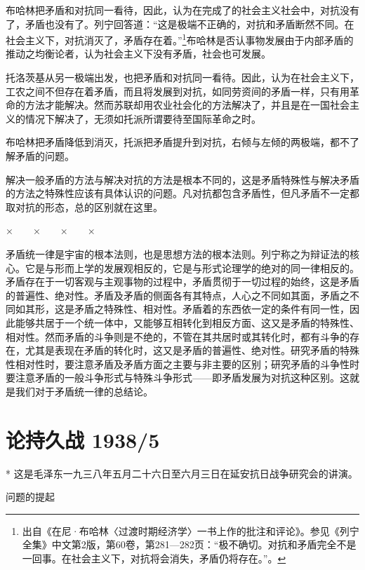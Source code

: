 \documentclass[UTF8, 12pt, a4paper]{ctexrep}
\begin{document}
布哈林把矛盾和对抗同一看待，因此，认为在完成了的社会主义社会中，对抗没有了，矛盾也没有了。列宁回答道：“这是极端不正确的，对抗和矛盾断然不同。在社会主义下，对抗消灭了，矛盾存在着。”\footnote{出自《在尼·布哈林〈过渡时期经济学〉一书上作的批注和评论》。参见《列宁全集》中文第2版，第60卷，第281—282页：“极不确切。对抗和矛盾完全不是一回事。在社会主义下，对抗将会消失，矛盾仍将存在。”。}布哈林是否认事物发展由于内部矛盾的推动之均衡论者，认为社会主义下没有矛盾，社会也可发展。

托洛茨基从另一极端出发，也把矛盾和对抗同一看待。因此，认为在社会主义下，工农之间不但存在着矛盾，而且将发展到对抗，如同劳资间的矛盾一样，只有用革命的方法才能解决。然而苏联却用农业社会化的方法解决了，并且是在一国社会主义的情况下解决了，无须如托派所谓要待至国际革命之时。

布哈林把矛盾降低到消灭，托派把矛盾提升到对抗，右倾与左倾的两极端，都不了解矛盾的问题。

解决一般矛盾的方法与解决对抗的方法是根本不同的，这是矛盾特殊性与解决矛盾的方法之特殊性应该有具体认识的问题。凡对抗都包含矛盾性，但凡矛盾不一定都取对抗的形态，总的区别就在这里。

×　　×　　×　　×

矛盾统一律是宇宙的根本法则，也是思想方法的根本法则。列宁称之为辩证法的核心。它是与形而上学的发展观相反的，它是与形式论理学的绝对的同一律相反的。矛盾存在于一切客观与主观事物的过程中，矛盾贯彻于一切过程的始终，这是矛盾的普遍性、绝对性。矛盾及矛盾的侧面各有其特点，人心之不同如其面，矛盾之不同如其形，这是矛盾之特殊性、相对性。矛盾着的东西依一定的条件有同一性，因此能够共居于一个统一体中，又能够互相转化到相反方面、这又是矛盾的特殊性、相对性。然而矛盾的斗争则是不绝的，不管在其共居时或其转化时，都有斗争的存在，尤其是表现在矛盾的转化时，这又是矛盾的普遍性、绝对性。研究矛盾的特殊性相对性时，要注意矛盾及矛盾方面之主要与非主要的区别；研究矛盾的斗争性时要注意矛盾的一般斗争形式与特殊斗争形式——即矛盾发展为对抗这种区别。这就是我们对于矛盾统一律的总结论。

\section{论持久战 1938/5}

* 这是毛泽东一九三八年五月二十六日至六月三日在延安抗日战争研究会的讲演。

问题的提起
\end{document}
